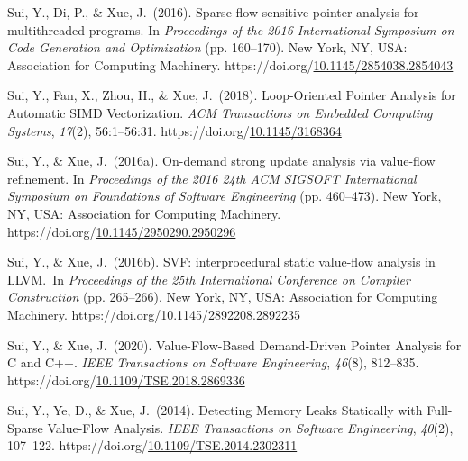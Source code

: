 \documentclass[12pt,twoside]{article}
\begin{document}
{\begin{thebibliography}{1079}
\mdbibitemlabel{}Sui, Y., Di, P., \& Xue, J.~(2016). Sparse flow-sensitive pointer analysis for multithreaded programs. In \emph{Proceedings of the 2016 International Symposium on Code Generation and Optimization} (pp. 160–170). New York, NY, USA: Association for Computing Machinery. https://doi.org/\href{https://dx.doi.org/10.1145/2854038.2854043}{10.1145/2854038.2854043}%

\mdbibitemlabel{}Sui, Y., Fan, X., Zhou, H., \& Xue, J.~(2018). Loop-Oriented Pointer Analysis for Automatic SIMD Vectorization. \emph{ACM Transactions on Embedded Computing Systems}, \emph{17}(2), 56:1–56:31. https://doi.org/\href{https://dx.doi.org/10.1145/3168364}{10.1145/3168364}%

\mdbibitemlabel{}Sui, Y., \& Xue, J.~(2016a). On-demand strong update analysis via value-flow refinement. In \emph{Proceedings of the 2016 24th ACM SIGSOFT International Symposium on Foundations of Software Engineering} (pp. 460–473). New York, NY, USA: Association for Computing Machinery. https://doi.org/\href{https://dx.doi.org/10.1145/2950290.2950296}{10.1145/2950290.2950296}%

\mdbibitemlabel{}Sui, Y., \& Xue, J.~(2016b). SVF: interprocedural static value-flow analysis in LLVM.~In \emph{Proceedings of the 25th International Conference on Compiler Construction} (pp. 265–266). New York, NY, USA: Association for Computing Machinery. https://doi.org/\href{https://dx.doi.org/10.1145/2892208.2892235}{10.1145/2892208.2892235}%

\mdbibitemlabel{}Sui, Y., \& Xue, J.~(2020). Value-Flow-Based Demand-Driven Pointer Analysis for C and C++. \emph{IEEE Transactions on Software Engineering}, \emph{46}(8), 812–835. https://doi.org/\href{https://dx.doi.org/10.1109/TSE.2018.2869336}{10.1109/TSE.2018.2869336}%

\mdbibitemlabel{}Sui, Y., Ye, D., \& Xue, J.~(2014). Detecting Memory Leaks Statically with Full-Sparse Value-Flow Analysis. \emph{IEEE Transactions on Software Engineering}, \emph{40}(2), 107–122. https://doi.org/\href{https://dx.doi.org/10.1109/TSE.2014.2302311}{10.1109/TSE.2014.2302311}%


\end{thebibliography}}
\end{document}
